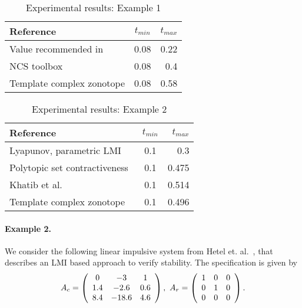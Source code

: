 \begin{table}
\begin{minipage}{1\textwidth}
  \center
\begin{tabular}{|l|c|r|}
  \hline
  Reference & $t_{min}$ & $t_{max}$ \\
\hline
Value recommended in~\cite{wittenmark2002computer} & 0.08 & 0.22\\
  \hline
  NCS toolbox~\cite{BauLoo_NECSYS12a} & 0.08 & 0.4 \\
\hline
  Template complex zonotope & 0.08 & 0.58 \\
  \hline
\end{tabular}
\caption{Experimental results: Example 1}
\label{tab:com1}
\end{minipage}
\end{table}

\begin{table}
\begin{minipage}{1\textwidth}
\label{tab:com2}
\center
\begin{tabular}{|l|c|r|}
\hline
    Reference & $t_{min}$ & $t_{max}$ \\
  \hline
  Lyapunov, parametric LMI~\cite{2013hetel} & 0.1 & 0.3 \\
  \hline
  Polytopic set contractiveness~\cite{2014-fiacchini-set} & 0.1 & 0.475 \\
  \hline
Khatib et al.~\cite{AlKhatib2015} & 0.1 & 0.514\\
\hline
  Template complex zonotope & 0.1 & 0.496 \\
  \hline
\end{tabular}
\caption{Experimental results: Example 2}
\label{tab:com2}
\end{minipage}
\end{table}

\paragraph{ Example 2.  } We consider the following linear impulsive system
from Hetel et. al.~\cite{2013hetel}, that describes an LMI based
approach to verify stability. The specification is given by
\[A_c=\left(\begin{array}{ccc} 0 & -3 & 1\\ 1.4 & -2.6 & 0.6\\ 8.4 &
  -18.6 & 4.6
\end{array}\right),~
A_r=\left(\begin{array}{ccc} 1 & 0 & 0\\ 0 & 1 & 0\\ 0 & 0 & 0
\end{array}\right).
\]

